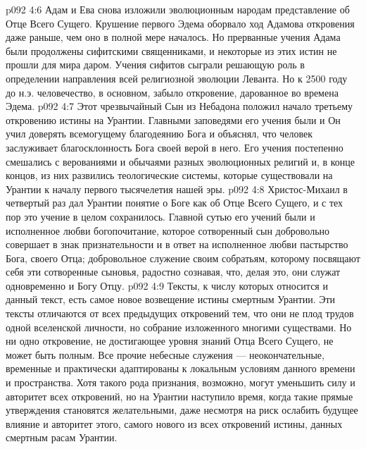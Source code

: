 \vs p092 4:6 \pc {}\bibnobreakspace {} Адам и Ева снова изложили эволюционным народам представление об Отце Всего Сущего. Крушение первого Эдема оборвало ход Адамова откровения даже раньше, чем оно в полной мере началось. Но прерванные учения Адама были продолжены сифитскими священниками, и некоторые из этих истин не прошли для мира даром. Учения сифитов сыграли решающую роль в определении направления всей религиозной эволюции Леванта. Но к 2500 году до н.э. человечество, в основном, забыло откровение, дарованное во времена Эдема.
\vs p092 4:7 \pc {}\bibnobreakspace {} Этот чрезвычайный Сын из Небадона положил начало третьему откровению истины на Урантии. Главными заповедями его учения были  и  Он учил доверять всемогущему благодеянию Бога и объяснял, что человек заслуживает благосклонность Бога своей верой в него. Его учения постепенно смешались с верованиями и обычаями разных эволюционных религий и, в конце концов, из них развились теологические системы, которые существовали на Урантии к началу первого тысячелетия нашей эры.
\vs p092 4:8 \pc {}\bibnobreakspace {} Христос\hyp{}Михаил в четвертый раз дал Урантии понятие о Боге как об Отце Всего Сущего, и с тех пор это учение в целом сохранилось. Главной сутью его учений были  и  исполненное любви богопочитание, которое сотворенный сын добровольно совершает в знак признательности и в ответ на исполненное любви пастырство Бога, своего Отца; добровольное служение своим собратьям, которому посвящают себя эти сотворенные сыновья, радостно сознавая, что, делая это, они служат одновременно и Богу Отцу.
\vs p092 4:9 \pc {}\bibnobreakspace {} Тексты, к числу которых относится и данный текст, есть самое новое возвещение истины смертным Урантии. Эти тексты отличаются от всех предыдущих откровений тем, что они не плод трудов одной вселенской личности, но собрание изложенного многими существами. Но ни одно откровение, не достигающее уровня знаний Отца Всего Сущего, не может быть полным. Все прочие небесные служения --- неокончательные, временные и практически адаптированы к локальным условиям данного времени и пространства. Хотя такого рода признания, возможно, могут уменьшить силу и авторитет всех откровений, но на Урантии наступило время, когда такие прямые утверждения становятся желательными, даже несмотря на риск ослабить будущее влияние и авторитет этого, самого нового из всех откровений истины, данных смертным расам Урантии.
